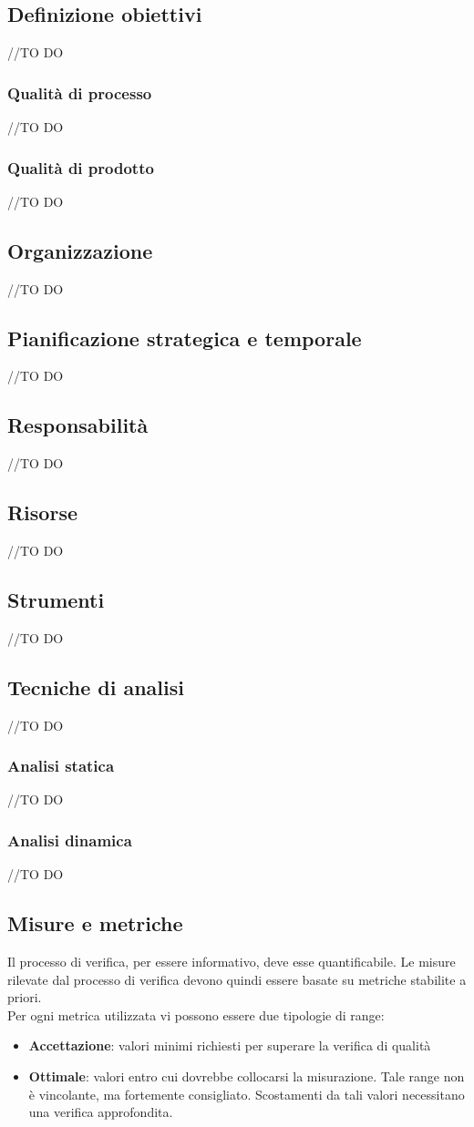 \documentclass[12pt,a4paper]{article}
\begin{document}
\subsection{Definizione obiettivi}
//TO DO \AB
\subsubsection{Qualità di processo}
//TO DO \AB
\subsubsection{Qualità di prodotto}
//TO DO \AB
\subsection{Organizzazione}
//TO DO \AB
\subsection{Pianificazione strategica e temporale}
//TO DO \AB
\subsection{Responsabilità}
//TO DO \AB
\subsection{Risorse}
//TO DO \AB
\subsection{Strumenti}
//TO DO \AB
\subsection{Tecniche di analisi}
//TO DO \AB
\subsubsection{Analisi statica}
//TO DO \AVI
\subsubsection{ Analisi dinamica}
//TO DO \AVI
\subsection{Misure e metriche}
Il processo di verifica, per essere informativo, deve esse quantificabile. Le misure rilevate dal processo di verifica devono quindi essere basate su metriche stabilite a priori.\\
Per ogni metrica utilizzata vi possono essere due tipologie di range:
\begin{itemize}
\item \textbf{Accettazione}: valori minimi richiesti per superare la verifica di qualità
\item \textbf{Ottimale}: valori entro cui dovrebbe collocarsi la misurazione. Tale range non è vincolante, ma fortemente consigliato. Scostamenti da tali valori necessitano una verifica approfondita.
\end{itemize}
\end{document}
